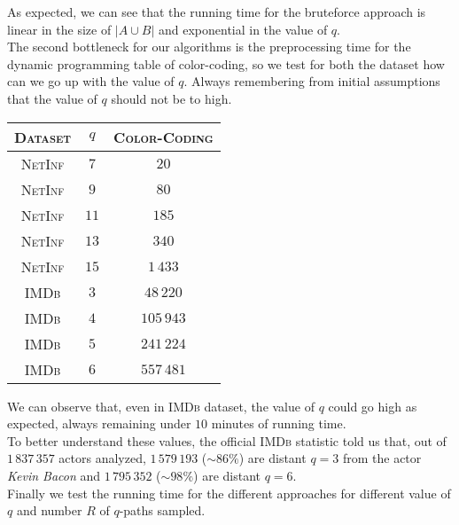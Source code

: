 	As expected, we can see that the running time for the bruteforce approach is linear in the size of $|A \cup B|$ and exponential in the value of $q$.\\
	
	The second bottleneck for our algorithms is the preprocessing time for the dynamic programming table of color-coding, so we test for both the dataset how can we go up with the value of $q$. Always remembering from initial assumptions that the value of $q$ should not be to high. 

	\begin{table}[h]
		\centering
		\label{my-label}
		\begin{tabular}{|c|c|c|}
			\hline
			\textsc{Dataset} & $q$  & \textsc{Color-Coding} \\ \hline
			\textsc{NetInf} & $7$  & $20$ \\ \hline
			\textsc{NetInf} & $9$  & $80$ \\ \hline
			\textsc{NetInf} & $11$ & $185$ \\ \hline
			\textsc{NetInf} & $13$ & $340$ \\ \hline
			\textsc{NetInf} & $15$ & $1\,433$ \\ \hline
			\textsc{IMDb}   & $3$  & $48\,220$ \\ \hline
			\textsc{IMDb}   & $4$  & $105\,943$ \\ \hline
			\textsc{IMDb}   & $5$  & $241\,224$ \\ \hline
			\textsc{IMDb}   & $6$  & $557\,481$ \\ \hline
		\end{tabular}
	\end{table}

	We can observe that, even in \textsc{IMDb} dataset, the value of $q$ could go high as expected, always remaining under $10$ minutes of running time. \\
	
	To better understand these values, the official \textsc{IMDb} statistic\cite{imdbstat} told us that, out of $1\,837\,357$ actors analyzed, $1\,579\,193$ ($\sim86\%$) are distant $q=3$ from the actor \textit{Kevin Bacon} and $1\,795\,352$ ($\sim98\%$) are distant $q=6$.\\
	
	Finally we test the running time for the different approaches for different value of $q$ and number $R$ of $q$-paths sampled. 
	
